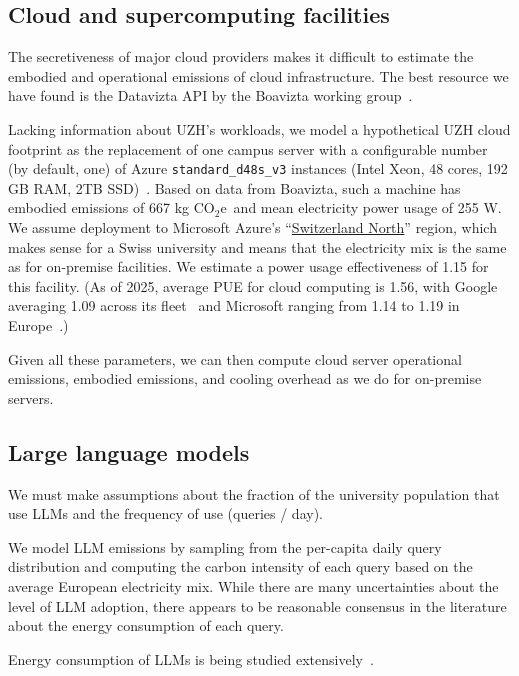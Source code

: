 \documentclass[11pt]{article}
\newcommand{\coe}{CO$_2$e}
\newcommand{\gcoe}{g \coe}
\newcommand{\kgcoe}{k\gcoe}
\begin{document}
\subsection{Cloud and supercomputing facilities}

The secretiveness of major cloud providers makes it difficult to estimate the embodied and operational emissions of cloud infrastructure. The best resource we have found is the Datavizta API by the Boavizta working group~\cite{boavizta:api}.

Lacking information about UZH's workloads, we model a hypothetical UZH cloud footprint as the replacement of one campus server with a configurable number (by default, one) of Azure {\tt standard\_d48s\_v3} instances (Intel Xeon, 48 cores, 192 GB RAM, 2TB SSD)~\cite{msftvms}. Based on data from Boavizta, such a machine has embodied emissions of 667 \kgcoe\ and mean electricity power usage of 255 W. We assume deployment to Microsoft Azure's ``\href{https://datacenters.microsoft.com/globe/explore?info=region_switzerlandnorth}{Switzerland North}'' region, which makes sense for a Swiss university and means that the electricity mix is the same as for on-premise facilities. We estimate a power usage effectiveness of 1.15 for this facility. (As of 2025, average PUE for cloud computing is 1.56, with Google averaging 1.09 across its fleet~\cite{google:datacenter:efficiency} and Microsoft ranging from 1.14 to 1.19 in Europe~\cite{microsoft:datacenter:efficiency}.)

Given all these parameters, we can then compute cloud server operational emissions, embodied emissions, and cooling overhead as we do for on-premise servers.

\subsection{Large language models}

We must make assumptions about the fraction of the university population that use LLMs and the frequency of use (queries / day).

We model LLM emissions by sampling from the per-capita daily query distribution and computing
the carbon intensity of each query based on the average European electricity mix. While there
are many uncertainties about the level of LLM adoption, there appears to be reasonable consensus
in the literature about the energy consumption of each query.

Energy consumption of LLMs is being studied extensively~\cite{budennyy2022eco2ai,castano2023exploring,devries2023growing,gowda2024watt,harding2024watts,heguerte2023estimate,luccioni2022estimating,luccioni2023counting,patterson2021carbon,rodriguez2024evaluating,tripp2024measuring}.
\end{document}
